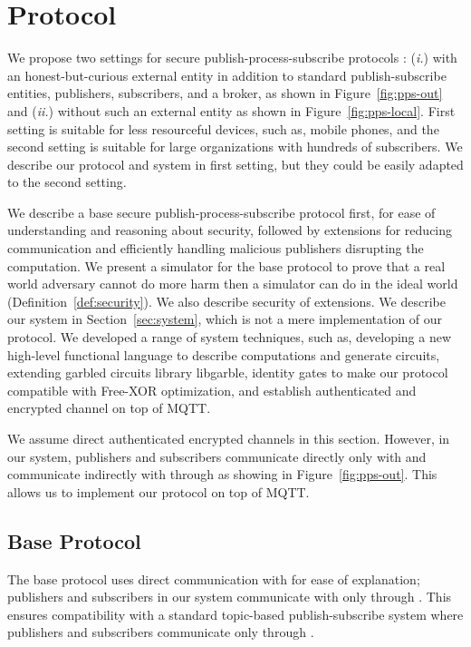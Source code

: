 \section{Protocol}
\label{sec:protocol}

We propose two settings for secure publish-process-subscribe protocols :
(\emph{i.}) with an honest-but-curious external entity in addition to standard
publish-subscribe entities, publishers, subscribers, and a broker, as shown in
Figure~\ref{fig:pps-out} and (\emph{ii.}) without such an external entity as
shown in Figure~\ref{fig:pps-local}. First setting is suitable for less
resourceful devices, such as, mobile phones, and the second setting is suitable
for large organizations with hundreds of subscribers. We describe our protocol
and system in first setting, but they could be easily adapted to the second
setting.



We describe a base secure publish-process-subscribe protocol first, for ease of
understanding and reasoning about security, followed by extensions for reducing
communication and efficiently handling malicious publishers disrupting the
computation.  We present a simulator for the base protocol to prove that a real
world adversary cannot do more harm then a simulator can do in the ideal world
(Definition~\ref{def:security}). We also describe security of extensions. We
describe our system in Section~\ref{sec:system}, which is not a mere
implementation of our protocol. We developed a range of system techniques, such
as, developing a new high-level functional language to describe computations
and generate circuits, extending garbled circuits library libgarble, identity
gates to make our protocol compatible with Free-XOR optimization, and establish
authenticated and encrypted channel on top of MQTT. 

We assume direct authenticated encrypted channels in this section.  However, in
our system, publishers and subscribers communicate directly only with \broker
and communicate indirectly with \garbler through \broker as showing in
Figure~\ref{fig:pps-out}. This allows us to implement our protocol on top of
MQTT.

\subsection{Base Protocol}


The base protocol uses direct communication with \garbler for ease of
explanation; publishers and subscribers in our system communicate with \garbler
only through \broker. This ensures compatibility with a standard topic-based
publish-subscribe system where publishers and subscribers communicate only
through \broker.

